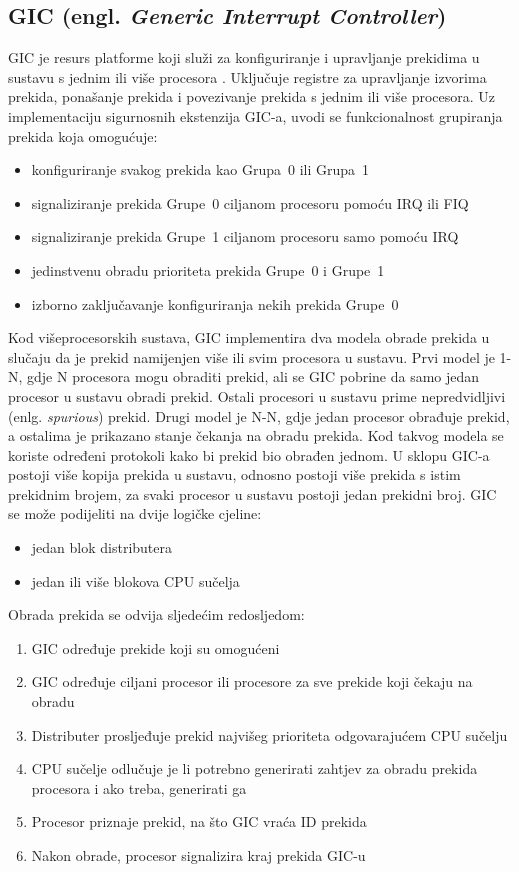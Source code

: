 \documentclass[times, utf8, diplomski, numeric]{fer}
\begin{document}
\subsection{GIC (engl. \textit{Generic Interrupt Controller})}
GIC je resurs platforme koji služi za konfiguriranje i upravljanje prekidima u sustavu s jednim ili više procesora
\cite{gic}.
Uključuje registre za upravljanje izvorima prekida, ponašanje prekida i povezivanje prekida s jednim ili više
procesora. Uz implementaciju sigurnosnih ekstenzija GIC-a, uvodi se funkcionalnost grupiranja prekida koja omogućuje:
\begin{itemize}
  \item{konfiguriranje svakog prekida kao Grupa~0 ili Grupa~1}
  \item{signaliziranje prekida Grupe~0 ciljanom procesoru pomoću IRQ ili FIQ}
  \item{signaliziranje prekida Grupe~1 ciljanom procesoru samo pomoću IRQ}
  \item{jedinstvenu obradu prioriteta prekida Grupe~0 i Grupe~1}
  \item{izborno zaključavanje konfiguriranja nekih prekida Grupe~0}
\end{itemize}
Kod višeprocesorskih sustava, GIC implementira dva modela obrade prekida u slučaju da je prekid namijenjen više
ili svim procesora u sustavu. Prvi model je 1-N, gdje N procesora mogu obraditi prekid, ali se GIC pobrine da samo
jedan procesor u sustavu obradi prekid. Ostali procesori u sustavu prime nepredvidljivi (enlg. \textit{spurious}) prekid.
Drugi model je N-N, gdje jedan procesor obrađuje prekid, a ostalima je prikazano stanje čekanja na obradu prekida.
Kod takvog modela se koriste određeni protokoli kako bi prekid bio obrađen jednom. U sklopu GIC-a postoji više kopija
prekida u sustavu, odnosno postoji više prekida s istim prekidnim brojem, za svaki procesor u sustavu postoji jedan prekidni
broj. GIC se može podijeliti na dvije logičke cjeline:
\begin{itemize}
  \item{jedan blok distributera}
  \item{jedan ili više blokova CPU sučelja}
\end{itemize}
Obrada prekida se odvija sljedećim redosljedom:
\begin{enumerate}
  \item{GIC određuje prekide koji su omogućeni}
  \item{GIC određuje ciljani procesor ili procesore za sve prekide koji čekaju na obradu}
  \item{Distributer prosljeđuje prekid najvišeg prioriteta odgovarajućem CPU sučelju}
  \item{CPU sučelje odlučuje je li potrebno generirati zahtjev za obradu prekida procesora i ako treba, generirati ga}
  \item{Procesor priznaje prekid, na što GIC vraća ID prekida}
  \item{Nakon obrade, procesor signalizira kraj prekida GIC-u}
\end{enumerate}
\end{document}
